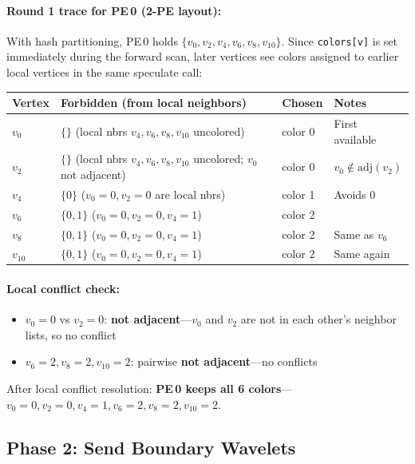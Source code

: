 \documentclass[11pt,letterpaper]{article}
\begin{document}
\paragraph{Round 1 trace for PE\,0 (2-PE layout):}

With hash partitioning, PE\,0 holds $\{v_0, v_2, v_4, v_6, v_8, v_{10}\}$. Since \texttt{colors[v]} is set immediately during the forward scan, later vertices see colors assigned to earlier local vertices in the same speculate call:

\begin{center}
\renewcommand{\arraystretch}{1.3}
\begin{tabular}{llll}
\toprule
\textbf{Vertex} & \textbf{Forbidden (from local neighbors)} & \textbf{Chosen} & \textbf{Notes} \\
\midrule
$v_0$ & $\{\}$ (local nbrs $v_4,v_6,v_8,v_{10}$ uncolored) & color 0 & First available \\
$v_2$ & $\{\}$ (local nbrs $v_4,v_6,v_8,v_{10}$ uncolored; $v_0$ not adjacent) & color 0 & $v_0 \notin \mathrm{adj}(v_2)$ \\
$v_4$ & $\{0\}$ ($v_0{=}0, v_2{=}0$ are local nbrs) & color 1 & Avoids 0 \\
$v_6$ & $\{0,1\}$ ($v_0{=}0, v_2{=}0, v_4{=}1$) & color 2 & \\
$v_8$ & $\{0,1\}$ ($v_0{=}0, v_2{=}0, v_4{=}1$) & color 2 & Same as $v_6$ \\
$v_{10}$ & $\{0,1\}$ ($v_0{=}0, v_2{=}0, v_4{=}1$) & color 2 & Same again \\
\bottomrule
\end{tabular}
\end{center}

\paragraph{Local conflict check:}
\begin{itemize}[nosep]
  \item $v_0{=}0$ vs $v_2{=}0$: \textbf{not adjacent}---$v_0$ and $v_2$ are not in each other's neighbor lists, so no conflict
  \item $v_6{=}2, v_8{=}2, v_{10}{=}2$: pairwise \textbf{not adjacent}---no conflicts
\end{itemize}

After local conflict resolution: \textbf{PE\,0 keeps all 6 colors}---$v_0{=}0, v_2{=}0, v_4{=}1, v_6{=}2, v_8{=}2, v_{10}{=}2$.

\subsection{Phase 2: Send Boundary Wavelets}
\end{document}
